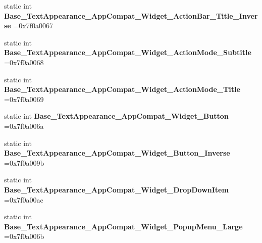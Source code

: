 \begin{DoxyCompactItemize}
\item 
\mbox{\label{classandroid_1_1support_1_1v7_1_1appcompat_1_1R_1_1style_aa972c2e7d0cc06c1548d4e4c42f74b87}} 
static int {\bfseries Base\+\_\+\+Text\+Appearance\+\_\+\+App\+Compat\+\_\+\+Widget\+\_\+\+Action\+Bar\+\_\+\+Title\+\_\+\+Inverse} =0x7f0a0067
\item 
\mbox{\label{classandroid_1_1support_1_1v7_1_1appcompat_1_1R_1_1style_aad81e060e49e2cd34f9d9d057aa20e96}} 
static int {\bfseries Base\+\_\+\+Text\+Appearance\+\_\+\+App\+Compat\+\_\+\+Widget\+\_\+\+Action\+Mode\+\_\+\+Subtitle} =0x7f0a0068
\item 
\mbox{\label{classandroid_1_1support_1_1v7_1_1appcompat_1_1R_1_1style_a87e043ec789205bd13148c341aa13aa2}} 
static int {\bfseries Base\+\_\+\+Text\+Appearance\+\_\+\+App\+Compat\+\_\+\+Widget\+\_\+\+Action\+Mode\+\_\+\+Title} =0x7f0a0069
\item 
\mbox{\label{classandroid_1_1support_1_1v7_1_1appcompat_1_1R_1_1style_a506ab679f692fee1a809256d0d70122c}} 
static int {\bfseries Base\+\_\+\+Text\+Appearance\+\_\+\+App\+Compat\+\_\+\+Widget\+\_\+\+Button} =0x7f0a006a
\item 
\mbox{\label{classandroid_1_1support_1_1v7_1_1appcompat_1_1R_1_1style_a42d5f5ecf75060b6b01b27340fe18bdf}} 
static int {\bfseries Base\+\_\+\+Text\+Appearance\+\_\+\+App\+Compat\+\_\+\+Widget\+\_\+\+Button\+\_\+\+Inverse} =0x7f0a009b
\item 
\mbox{\label{classandroid_1_1support_1_1v7_1_1appcompat_1_1R_1_1style_a8e14dfb72e9d48a894f07d8b7759aece}} 
static int {\bfseries Base\+\_\+\+Text\+Appearance\+\_\+\+App\+Compat\+\_\+\+Widget\+\_\+\+Drop\+Down\+Item} =0x7f0a00ac
\item 
\mbox{\label{classandroid_1_1support_1_1v7_1_1appcompat_1_1R_1_1style_a17835572258d87992a879cd2e5590963}} 
static int {\bfseries Base\+\_\+\+Text\+Appearance\+\_\+\+App\+Compat\+\_\+\+Widget\+\_\+\+Popup\+Menu\+\_\+\+Large} =0x7f0a006b

\end{DoxyCompactItemize}

